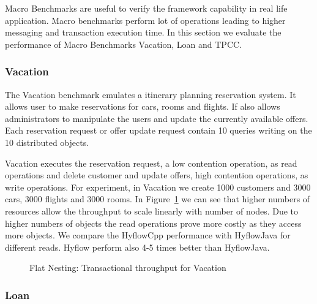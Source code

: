 \documentclass[12pt,english]{report}
\begin{document}
Macro Benchmarks are useful to verify the framework capability in real life application. Macro benchmarks perform lot of operations leading to higher messaging and transaction execution time. In this section we evaluate the performance of Macro Benchmarks Vacation, Loan and TPCC.

\subsubsection{Vacation}

The Vacation benchmark emulates a itinerary planning reservation system. It allows user to make reservations for cars, rooms and flights. If also allows administrators to manipulate the users and update the currently available offers. Each reservation request or offer update request contain 10 queries writing on the 10 distributed objects. 

Vacation executes the reservation request, a low contention operation, as read operations and delete customer and update offers, high contention operations, as write operations. For experiment, in Vacation we create 1000 customers and 3000 cars, 3000 flights and 3000 rooms. In Figure~\ref{Fig:flatVacation} we can see  that higher numbers of resources allow the throughput to scale linearly with number of nodes. Due to higher numbers of objects the read operations prove more costly as they access more objects. We compare the HyflowCpp performance with HyflowJava for different reads. Hyflow perform also 4-5 times better than HyflowJava. 

\begin{figure}[H]
\centering
{}
\end{figure}
\begin{figure}[H]
\centering
{}
\end{figure}

\begin{figure}[H]
\centering
{}
\caption{Flat Nesting: Transactional throughput for Vacation}
\label{Fig:flatVacation}
\end{figure}

\subsubsection{Loan}
\end{document}
